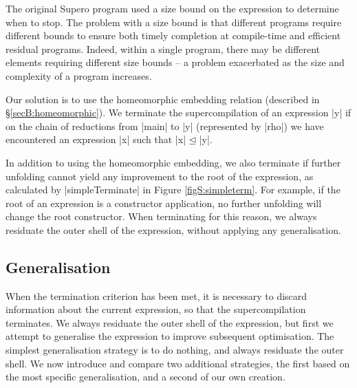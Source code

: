 The original Supero program used a size bound on the expression to determine when to stop. The problem with a size bound is that different programs require different bounds to ensure both timely completion at compile-time and efficient residual programs. Indeed, within a single program, there may be different elements requiring different size bounds -- a problem exacerbated as the size and complexity of a program increases.

Our solution is to use the homeomorphic embedding relation (described in \S\ref{secB:homeomorphic}). We terminate the supercompilation of an expression |y| if on the chain of reductions from |main| to |y| (represented by |rho|) we have encountered an expression |x| such that |x| $\unlhd$ |y|.


In addition to using the homeomorphic embedding, we also terminate if further unfolding cannot yield any improvement to the root of the expression, as calculated by |simpleTerminate| in Figure \ref{figS:simpleterm}. For example, if the root of an expression is a constructor application, no further unfolding will change the root constructor. When terminating for this reason, we always residuate the outer shell of the expression, without applying any generalisation.

\subsection{Generalisation}

When the termination criterion has been met, it is necessary to discard information about the current expression, so that the supercompilation terminates. We always residuate the outer shell of the expression, but first we attempt to generalise the expression to improve subsequent optimisation. The simplest generalisation strategy is to do nothing, and always residuate the outer shell. We now introduce and compare two additional strategies, the first based on the most specific generalisation, and a second of our own creation.


